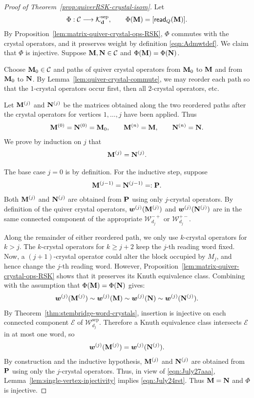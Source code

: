 \documentclass[12pt]{amsart}
\newcommand{\bs}{\boldsymbol}
\theoremstyle{definition}
\theoremstyle{remark}
\begin{document}
\begin{proof}[Proof of Theorem~\ref{prop:quiverRSK-crystal-isom}]
Let
\[
\Phi:{\mathcal C}\longrightarrow
{\mathcal K}_{\bf d}^{\operatorname{sep}},
\qquad
\Phi({\bf M})=[{\sf read}_Q({\bf M})].
\]
By Proposition~\ref{lem:matrix-quiver-crystal-ops-RSK}, $\Phi$ commutes with the
crystal operators, and it preserves weight by definition \eqref{eqn:Admwtdef}. We claim that $\Phi$ is
injective. Suppose ${\bf M},{\bf N}\in{\mathcal C}$ and
$\Phi({\bf M})=\Phi({\bf N})$.

Choose ${\bf M}_0\in{\mathcal C}$ and paths of quiver crystal
operators from ${\bf M}_0$ to ${\bf M}$ and from ${\bf M}_0$ to
${\bf N}$. By Lemma~\ref{lem:quiver-crystal-commute}, we may reorder
each path so that the $1$-crystal operators occur first, then all $2$-crystal operators, etc.

Let ${\bf M}^{(j)}$ and ${\bf N}^{(j)}$ be the matrices obtained
along the two reordered paths after the crystal operators for
vertices $1,\ldots,j$ have been applied. Thus
\[
{\bf M}^{(0)}={\bf N}^{(0)}={\bf M}_0,\qquad
{\bf M}^{(n)}={\bf M},\qquad
{\bf N}^{(n)}={\bf N}.
\]
We prove by induction on $j$ that
\begin{equation}\label{eqn:July24rst}
{\bf M}^{(j)}={\bf N}^{(j)}.
\end{equation}

The base case $j=0$ is by definition. For the inductive step, suppose
\[{\bf M}^{(j-1)}={\bf N}^{(j-1)}=: {\bf P}.\]
Both ${\bf M}^{(j)}$ and ${\bf N}^{(j)}$ are obtained from ${\bf P}$
using only $j$-crystal operators. 
By definition of the quiver
crystal operators, ${\bs w}^{(j)}({\bf M}^{(j)})$ and ${\bs w}^{(j)}({\bf N}^{(j)})$ are in the same connected component of the appropriate
$\mathcal W_{d_j}^{-+}$ or $\mathcal W_{d_j}^{+-}$.

Along the remainder of either reordered path, we only use $k$-crystal operators for
$k>j$. The $k$-crystal operators for $k\geq j+2$ keep the $j$-th reading word
fixed. Now, a $(j+1)$-crystal operator could alter the block occupied by $M_j$, 
and hence change the $j$-th reading word. However,
Proposition~\ref{lem:matrix-quiver-crystal-ops-RSK} shows that it
preserves its Knuth equivalence class. Combining with the assumption that
$\Phi({\bf M})=\Phi({\bf N})$ gives:
\[{\bs w}^{(j)}({\bf M}^{(j)})\sim {\bs w}^{(j)}({\bf M})\sim {\bs w}^{(j)}({\bf N})\sim {\bs w}^{(j)}({\bf N}^{(j)}).\]
By Theorem~\ref{thm:stembridge-word-crystals}, insertion is injective on
each connected component ${\mathcal E}$ of
${\mathcal W}_{d_j}^{\operatorname{sep}}$. Therefore a Knuth
equivalence class intersects ${\mathcal E}$ in at most one
word, so
\begin{equation}
\label{eqn:July27aaa}
{\bs w}^{(j)}({\bf M}^{(j)})={\bs w}^{(j)}({\bf N}^{(j)}).
\end{equation}
By construction and the inductive hypothesis, ${\bf M}^{(j)}$ and ${\bf N}^{(j)}$ are obtained from ${\bf P}$ using only the $j$-crystal operators.
Thus, in view of \eqref{eqn:July27aaa}, 
Lemma~\ref{lem:single-vertex-injectivity} implies \eqref{eqn:July24rst}. Thus ${\bf M}={\bf N}$ and
$\Phi$ is injective.


\end{proof}
\end{document}
